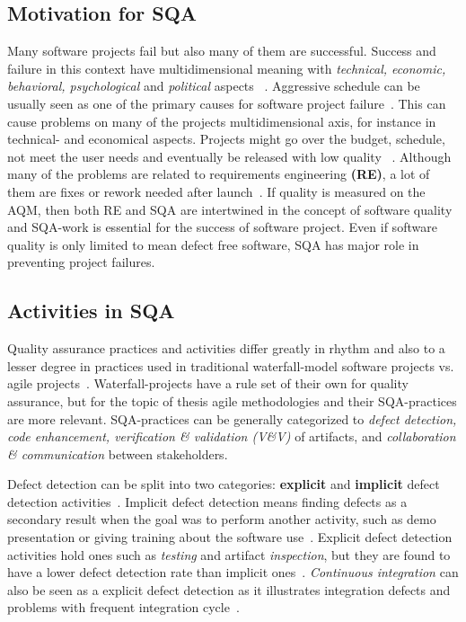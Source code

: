     \subsection{Motivation for SQA}
    Many software projects fail but also many of them are successful. Success and failure in this context have multidimensional meaning with
    \textit{technical, economic, behavioral, psychological} and \textit{political} aspects ~\cite{mcleod2011factors}. Aggressive
    schedule can be usually seen as one of the primary causes for software project failure~\cite{cerpa2009did}. This can cause
    problems on many of the projects multidimensional axis, for instance in technical- and economical aspects. Projects might go
    over the budget, schedule, not meet the user needs and eventually be released with low quality ~\cite{cerpa2009did}.
    Although many of the problems are related to requirements engineering \textbf{(RE)}, a lot of them are fixes or rework needed after launch~\cite{lessons}.
    If quality is measured on the AQM, then both RE and SQA are intertwined in the concept of software quality and SQA-work
    is essential for the success of software project. Even if software quality is only limited to mean defect free software, SQA has
    major role in preventing project failures.

    \subsection{Activities in SQA}
    Quality assurance practices and activities differ greatly in rhythm and also to a lesser degree in practices used in
    traditional waterfall-model software projects vs. agile projects~\cite{huo2004software}. Waterfall-projects have a rule set
    of their own for quality assurance, but for the topic of thesis agile methodologies and their SQA-practices are more relevant.
    SQA-practices can be generally categorized to \textit{defect detection, code enhancement, verification \& validation (V\&V)} of artifacts,
    and \textit{collaboration \& communication} between stakeholders.

    Defect detection can be split into two categories: \textbf{explicit} and \textbf{implicit} defect detection activities~\cite{mantyla2014software}.
    Implicit defect detection means finding defects as a secondary result when the goal was to perform another activity,
    such as demo presentation or giving training about the software use~\cite{mantyla2014software}. Explicit defect detection activities
    hold ones such as \textit{testing} and artifact \textit{inspection}, but they are found to have a lower
    defect detection rate than implicit ones~\cite{mantyla2014software}. \textit{Continuous integration} can also be seen
    as a explicit defect detection as it illustrates integration defects and problems with frequent integration cycle~\cite{huo2004software}.

